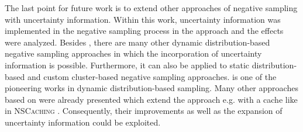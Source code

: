 The last point for future work is to extend other approaches of negative sampling with uncertainty information.
Within this work, uncertainty information was implemented in the negative sampling process in the \kbgan approach and the effects were analyzed.
Besides \kbgan, there are many other dynamic distribution-based negative sampling approaches in which the incorporation of uncertainty information is possible.
Furthermore, it can also be applied to static distribution-based and custom cluster-based negative sampling approaches.
\kbgan is one of the pioneering works in dynamic distribution-based sampling.
Many other approaches based on \kbgan were already presented which extend the approach e.g. with a cache like in \textsc{NSCaching} \cite{zhang2019nscaching}.
Consequently, their improvements as well as the expansion of uncertainty information could be exploited.

